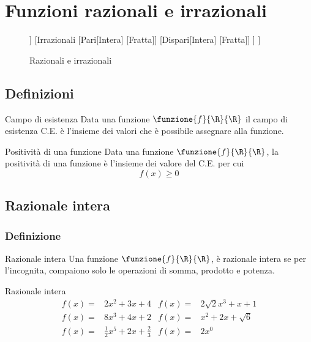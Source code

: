 \chapter{Funzioni razionali e irrazionali}
\begin{figure}
	\centering
	\begin{forest}
		[Funzioni[Razionali
		[Intera]
		[Fratta]]
		[Irrazionali
		[Pari[Intera]
		[Fratta]]
		[Dispari[Intera]
		[Fratta]]
		]
		]
	\end{forest}
	\caption{Razionali e irrazionali}
	\label{FunzioniRazionaliIrrazionali}
\end{figure}
\section{Definizioni}
\begin{definizionet}{Campo di esistenza}{}
Data una funzione $\funzione{f}{\R}{\R}$ il campo di esistenza C.E. è 
l'insieme dei valori che è possibile assegnare alla 
funzione.
\end{definizionet}
\begin{definizionet}{Positività di una funzione}{}
	Data una funzione $\funzione{f}{\R}{\R}$, la 
	positività di una funzione è l'insieme dei 
	valore del C.E. per cui\[f(x)\geq 0 \]
\end{definizionet}
\section{Razionale intera}
\subsection{Definizione}
\begin{definizionet}{Razionale intera}{}
Una funzione $\funzione{f}{\R}{\R}$,  è  razionale intera se per l'incognita,  compaiono solo le operazioni di somma, prodotto e potenza.
\end{definizionet}
\begin{esempiot}{Razionale intera}{}
	\begin{align*}
	f(x)=&2x^2+3x+4&f(x)=&2\sqrt{2}x^3+x+1\\
		f(x)=&8x^3+4x+2&f(x)=&x^2+2x+\sqrt{6}\\
		f(x)=&\frac{1}{2}x^5+2x+\frac{2}{3}&f(x)=&2x^0\\
	\end{align*}
\end{esempiot}
